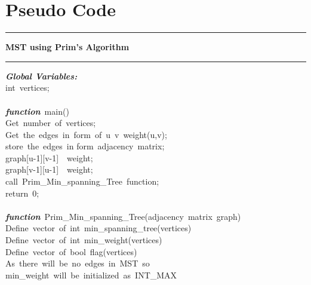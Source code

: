 \documentclass[conference]{IEEEtran}
\begin{document}
\section{Pseudo Code}
\vspace{5pt}
\hrule height 0.4pt depth 1pt width 250pt \relax
\vspace{5pt}
\textbf{MST using Prim's Algorithm}
\vspace{5pt}
\hrule height 0.4pt depth 1pt width 250pt \relax
\vspace{5pt}
\textbf{\textit{Global Variables:}}\\
\hspace*{7mm} int\ vertices;\\
\\
\hspace*{4mm}\textbf{\textit{function}}\ main()\\
\hspace*{7mm}Get\ number\ of\ vertices;\\
\hspace*{7mm}Get\ the\ edges\ in\ form\ of\ u\ v\ weight(u,v);\\
\hspace*{7mm}store\ the\ edges\ in form\ adjacency\ matrix;\\
\hspace*{7mm}graph[u-1][v-1]\ \leftarrow\ weight;\\
\hspace*{7mm}graph[v-1][u-1]\ \leftarrow\ weight;\\
\hspace*{7mm}call\ Prim\_Min\_spanning\_Tree\ function;\\
\hspace*{7mm}return\ 0;\\
\\
\hspace*{4mm}\textbf{\textit{function}}\ Prim\_Min\_spanning\_Tree(adjacency\ matrix\ graph)\\
\hspace*{7mm}Define\ vector\ of\ int\ min\_spanning\_tree(vertices)\\
\hspace*{7mm}Define\ vector\ of\ int\ min\_weight(vertices)\\
\hspace*{7mm}Define\ vector\ of\ bool\ flag(vertices)\\
\hspace*{7mm}As\ there\ will\ be\ no\ edges\ in\ MST\ so\\
\hspace*{7mm}min\_weight\ will\ be\ initialized\ as\ INT\_MAX\\
\end{document}
